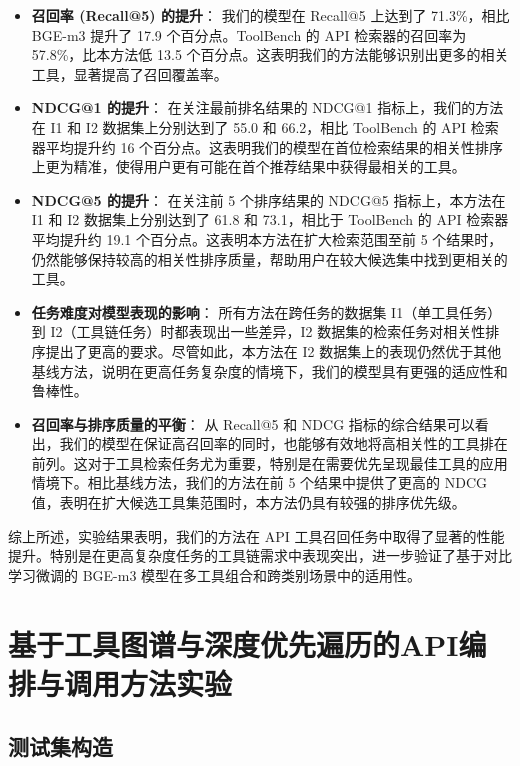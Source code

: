 \begin{itemize}
    \item \textbf{召回率 (Recall@5) 的提升}：
    我们的模型在 Recall@5 上达到了 71.3\%，相比 BGE-m3 提升了 17.9 个百分点。ToolBench 的 API 检索器的召回率为 57.8\%，比本方法低 13.5 个百分点。这表明我们的方法能够识别出更多的相关工具，显著提高了召回覆盖率。

    \item \textbf{NDCG@1 的提升}：
    在关注最前排名结果的 NDCG@1 指标上，我们的方法在 I1 和 I2 数据集上分别达到了 55.0 和 66.2，相比 ToolBench 的 API 检索器平均提升约 16 个百分点。这表明我们的模型在首位检索结果的相关性排序上更为精准，使得用户更有可能在首个推荐结果中获得最相关的工具。

    \item \textbf{NDCG@5 的提升}：
    在关注前 5 个排序结果的 NDCG@5 指标上，本方法在 I1 和 I2 数据集上分别达到了 61.8 和 73.1，相比于 ToolBench 的 API 检索器平均提升约 19.1 个百分点。这表明本方法在扩大检索范围至前 5 个结果时，仍然能够保持较高的相关性排序质量，帮助用户在较大候选集中找到更相关的工具。

    \item \textbf{任务难度对模型表现的影响}：
    所有方法在跨任务的数据集 I1（单工具任务）到 I2（工具链任务）时都表现出一些差异，I2 数据集的检索任务对相关性排序提出了更高的要求。尽管如此，本方法在 I2 数据集上的表现仍然优于其他基线方法，说明在更高任务复杂度的情境下，我们的模型具有更强的适应性和鲁棒性。

    \item \textbf{召回率与排序质量的平衡}：
    从 Recall@5 和 NDCG 指标的综合结果可以看出，我们的模型在保证高召回率的同时，也能够有效地将高相关性的工具排在前列。这对于工具检索任务尤为重要，特别是在需要优先呈现最佳工具的应用情境下。相比基线方法，我们的方法在前 5 个结果中提供了更高的 NDCG 值，表明在扩大候选工具集范围时，本方法仍具有较强的排序优先级。

\end{itemize}

综上所述，实验结果表明，我们的方法在 API 工具召回任务中取得了显著的性能提升。特别是在更高复杂度任务的工具链需求中表现突出，进一步验证了基于对比学习微调的 BGE-m3 模型在多工具组合和跨类别场景中的适用性。

\section{基于工具图谱与深度优先遍历的API编排与调用方法实验}

\subsection{测试集构造}

